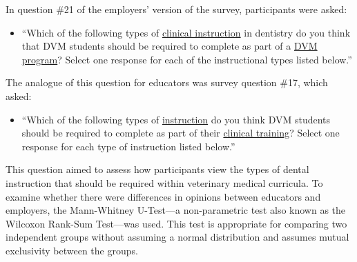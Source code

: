 \documentclass[
  11pt,
  letterpaper,
  DIV=11,
  numbers=noendperiod]{scrartcl}
\providecommand{\tightlist}{%
  \setlength{\itemsep}{0pt}\setlength{\parskip}{0pt}}\usepackage{longtable,booktabs,array}
\numberwithin{figure}{section}
\begin{document}
In question \#21 of the employers' version of the survey, participants
were asked:

\begin{itemize}
\tightlist
\item
  ``Which of the following types of \ul{clinical instruction} in
  dentistry do you think that DVM students should be required to
  complete as part of a \ul{DVM program}? Select one response for each
  of the instructional types listed below.''
\end{itemize}

The analogue of this question for educators was survey question \#17,
which asked:

\begin{itemize}
\tightlist
\item
  ``Which of the following types of \ul{instruction} do you think DVM
  students should be required to complete as part of their \ul{clinical
  training}? Select one response for each type of instruction listed
  below.''
\end{itemize}

This question aimed to assess how participants view the types of dental
instruction that should be required within veterinary medical curricula.
To examine whether there were differences in opinions between educators
and employers, the Mann-Whitney U-Test---a non-parametric test also
known as the Wilcoxon Rank-Sum Test---was used. This test is appropriate
for comparing two independent groups without assuming a normal
distribution and assumes mutual exclusivity between the groups.
\end{document}
